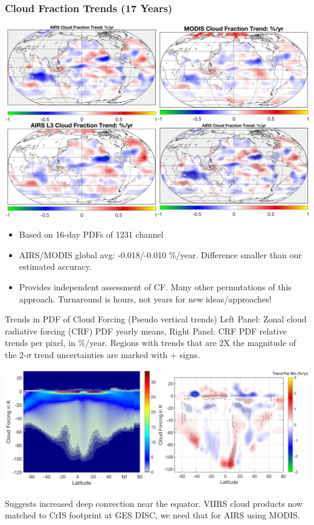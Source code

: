 \documentclass[10pt,t]{beamer}
\begin{document}
\begin{frame}
\frametitle{Cloud Fraction Trends (17 Years)}
\vspace{-0.1in}
\begin{center}
\includegraphics[width=0.85\linewidth]{./Yung/allrate4_small.png}
\end{center}

\vspace{-0.1in}
\footnotesize
\begin{itemize}
\item Based on 16-day PDFs of 1231 \wn channel
\item AIRS/MODIS global avg: -0.018/-0.010 \%/year.  Difference smaller than our estimated accuracy.
\item Provides independent assessment of CF.  Many other permutations of this approach.  Turnaround is hours, not years for new ideas/approaches!
\end{itemize}
\end{frame}
\begin{frame}[label={sec:orge76b9d0}]{Trends in PDF of Cloud Forcing (Pseudo vertical trends)}
Left Panel: Zonal cloud radiative forcing (CRF) PDF yearly means, Right Panel: CRF PDF relative trends per pixel, in \%/year.  Regions with trends that are 2X the magnitude of the 2-\(\sigma\) trend uncertainties are marked with + signs.
\begin{center}
\includegraphics[width=\linewidth]{./Yung/bt_forcing_summary.png}
\end{center}

\footnotesize Suggests increased deep convection near the equator.   VIIRS cloud products now matched to CrIS footprint at GES DISC, we need that for AIRS using MODIS.
\end{frame}
\end{document}
